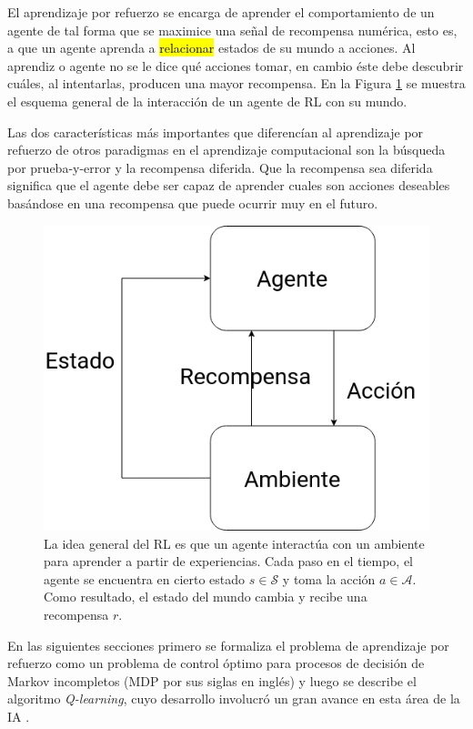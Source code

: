 El aprendizaje por refuerzo se encarga de aprender el comportamiento de un agente 
de tal forma que se maximice una señal de recompensa numérica, esto es, a que un
agente aprenda a \hl{relacionar} estados de su mundo a acciones. Al aprendiz o agente no se le 
dice qué acciones tomar, en cambio éste debe descubrir cuáles, al intentarlas, producen
una mayor recompensa. 
En la Figura \ref{fig:rl-outline} se muestra el esquema general de la interacción de un agente de RL con su mundo.

Las dos características más importantes que diferencían al
aprendizaje por refuerzo de otros paradigmas en el aprendizaje computacional son 
la búsqueda por prueba-y-error y la recompensa diferida. Que la recompensa sea diferida significa que el agente debe ser 
capaz de aprender cuales son acciones deseables basándose en una recompensa que puede ocurrir muy en el futuro.

\begin{figure}[h]
    \centering
    \includegraphics[scale=0.4]{Chapter2/Figs/agend_interaction.png}
   
    \caption{La idea general del RL es que un agente interactúa con un ambiente para
    aprender a partir de experiencias. Cada paso en el tiempo, el agente se encuentra
    en cierto estado $s\in \mathcal{S}$ y toma la acción $a \in \mathcal{A}$. Como
    resultado, el estado del mundo cambia y recibe una recompensa $r$.  \label{fig:rl-outline}}
\end{figure}

En las siguientes secciones primero se formaliza el problema de aprendizaje por refuerzo como
un problema de control óptimo para procesos de decisión de Markov incompletos (MDP por sus siglas en inglés) y luego se
describe el algoritmo \textit{Q-learning}, cuyo desarrollo involucró un gran avance en esta área de la IA  .

